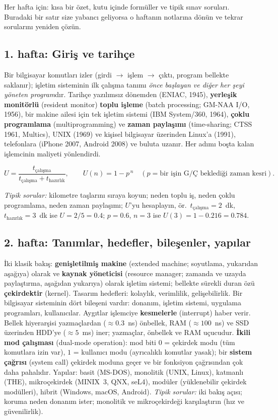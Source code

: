 \documentclass[11pt,a4paper]{article}
\newcommand{\term}[1]{\textbf{\color{mintdeep}#1}}
\begin{document}
Her hafta için: kısa bir özet, kutu içinde formüller ve tipik sınav soruları. Buradaki bir satır size yabancı geliyorsa o haftanın notlarına dönün ve tekrar sorularını yeniden çözün.

\subsection{1. hafta: Giriş ve tarihçe}
Bir bilgisayar komutları izler (girdi $\to$ işlem $\to$ çıktı, program bellekte saklanır); işletim sisteminin ilk çalışma tanımı \emph{önce başlayan ve diğer her şeyi yöneten program}dır. Tarihçe yazılımsız dönemden (ENIAC, 1945), \term{yerleşik monitörlü} (resident monitor) \term{toplu işleme} (batch processing; GM-NAA I/O, 1956), bir makine ailesi için tek işletim sistemi (IBM System/360, 1964), \term{çoklu programlama} (multiprogramming) ve \term{zaman paylaşımı} (time-sharing; CTSS 1961, Multics), UNIX (1969) ve kişisel bilgisayar üzerinden Linux'a (1991), telefonlara (iPhone 2007, Android 2008) ve buluta uzanır. Her adımı boşta kalan işlemcinin maliyeti yönlendirdi.
\begin{example}
\[
U = \frac{t_{\text{çalışma}}}{t_{\text{çalışma}} + t_{\text{hazırlık}}}, \qquad U(n) = 1 - p^{\,n}\quad(p = \text{bir işin G/Ç beklediği zaman kesri}).
\]
\end{example}
\textit{Tipik sorular:} kilometre taşlarını sıraya koyun; neden toplu iş, neden çoklu programlama, neden zaman paylaşımı; $U$'yu hesaplayın, ör.\ $t_{\text{çalışma}} = 2$~dk, $t_{\text{hazırlık}} = 3$~dk ise $U = 2/5 = 0.4$; $p = 0.6$, $n=3$ ise $U(3) = 1 - 0.216 = 0.784$.

\subsection{2. hafta: Tanımlar, hedefler, bileşenler, yapılar}
İki klasik bakış: \term{genişletilmiş makine} (extended machine; soyutlama, yukarıdan aşağıya) olarak ve \term{kaynak yöneticisi} (resource manager; zamanda ve uzayda paylaştırma, aşağıdan yukarıya) olarak işletim sistemi; bellekte sürekli duran özü \term{çekirdektir} (kernel). Tasarım hedefleri: kolaylık, verimlilik, gelişebilirlik. Bir bilgisayar sisteminin dört bileşeni vardır: donanım, işletim sistemi, uygulama programları, kullanıcılar. Aygıtlar işlemciye \term{kesmelerle} (interrupt) haber verir. Bellek hiyerarşisi yazmaçlardan ($\approx 0.3$~ns) önbellek, RAM ($\approx 100$~ns) ve SSD üzerinden HDD'ye ($\approx 5$~ms) iner; yazmaçlar, önbellek ve RAM uçucudur. \term{İkili mod çalışması} (dual-mode operation): mod biti $0$ = çekirdek modu (tüm komutlara izin var), $1$ = kullanıcı modu (ayrıcalıklı komutlar yasak); bir \term{sistem çağrısı} (system call) çekirdek moduna geçer ve bir fonksiyon çağrısından çok daha pahalıdır. Yapılar: basit (MS-DOS), monolitik (UNIX, Linux), katmanlı (THE), mikroçekirdek (MINIX~3, QNX, seL4), modüler (yüklenebilir çekirdek modülleri), hibrit (Windows, macOS, Android).
\textit{Tipik sorular:} iki bakış açısı; koruma neden donanım ister; monolitik ve mikroçekirdeği karşılaştırın (hız ve güvenilirlik).
\end{document}
